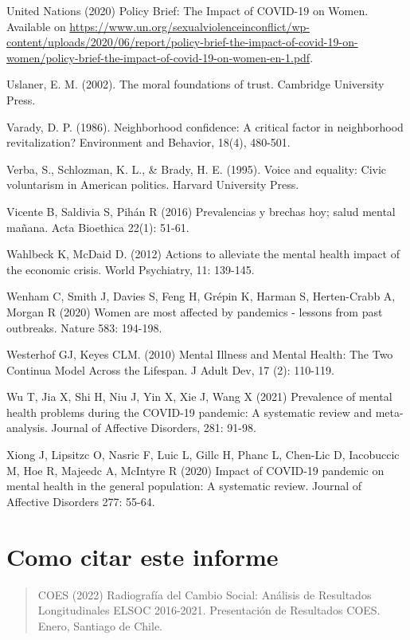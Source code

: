 \documentclass[
  12pt,
]{book}
\begin{document}
United Nations (2020) Policy Brief: The Impact of COVID-19 on Women. Available on \url{https://www.un.org/sexualviolenceinconflict/wp-content/uploads/2020/06/report/policy-brief-the-impact-of-covid-19-on-women/policy-brief-the-impact-of-covid-19-on-women-en-1.pdf}.

Uslaner, E. M. (2002). The moral foundations of trust. Cambridge University Press.

Varady, D. P. (1986). Neighborhood confidence: A critical factor in neighborhood revitalization? Environment and Behavior, 18(4), 480-501.

Verba, S., Schlozman, K. L., \& Brady, H. E. (1995). Voice and equality: Civic voluntarism in American politics. Harvard University Press.

Vicente B, Saldivia S, Pihán R (2016) Prevalencias y brechas hoy; salud mental mañana. Acta Bioethica 22(1): 51-61.

Wahlbeck K, McDaid D. (2012) Actions to alleviate the mental health impact of the economic crisis. World Psychiatry, 11: 139-145.

Wenham C, Smith J, Davies S, Feng H, Grépin K, Harman S, Herten-Crabb A, Morgan R (2020) Women are most affected by pandemics - lessons from past outbreaks. Nature 583: 194-198.

Westerhof GJ, Keyes CLM. (2010) Mental Illness and Mental Health: The Two Continua Model Across the Lifespan. J Adult Dev, 17 (2): 110-119.

Wu T, Jia X, Shi H, Niu J, Yin X, Xie J, Wang X (2021) Prevalence of mental health problems during the COVID-19 pandemic: A systematic review and meta-analysis. Journal of Affective Disorders, 281: 91-98.

Xiong J, Lipsitzc O, Nasric F, Luic L, Gillc H, Phanc L, Chen-Lic D, Iacobuccic M, Hoe R, Majeedc A, McIntyre R (2020) Impact of COVID-19 pandemic on mental health in the general population: A systematic review. Journal of Affective Disorders 277: 55-64.

\hypertarget{como-citar-este-informe}{%
\chapter*{Como citar este informe}\label{como-citar-este-informe}}

\begin{quote}
COES (2022) Radiografía del Cambio Social: Análisis de Resultados Longitudinales ELSOC 2016-2021. Presentación de Resultados COES. Enero, Santiago de Chile.
\end{quote}
\end{document}
